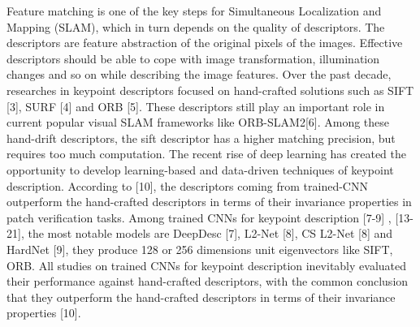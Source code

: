 \documentclass[letterpaper, 10 pt, conference]{ieeeconf}  %
\begin{document}
Feature matching is one of the key steps for Simultaneous Localization and Mapping (SLAM), which in turn depends on the quality of descriptors. The descriptors are feature abstraction of the original pixels of the images. Effective descriptors should be able to cope with image transformation, illumination changes and so on while describing the image features.
Over the past decade, researches in keypoint descriptors focused on hand-crafted solutions such as SIFT [3], SURF [4] and ORB [5]. These descriptors still play an important role in current popular visual SLAM frameworks like ORB-SLAM2[6]. Among these hand-drift descriptors, the sift descriptor has a higher matching precision, but requires too much computation. 
The recent rise of deep learning has created the opportunity to develop learning-based and data-driven techniques of keypoint description. According to [10], the descriptors coming from trained-CNN outperform the hand-crafted descriptors in terms of their invariance properties in patch verification tasks. Among trained CNNs for keypoint description [7-9] , [13-21], the most notable models are DeepDesc [7], L2-Net [8], CS L2-Net [8] and HardNet [9], they produce 128 or 256 dimensions unit eigenvectors like SIFT, ORB. All studies on trained CNNs for keypoint description inevitably evaluated their performance against hand-crafted descriptors, with the common conclusion that they outperform the hand-crafted descriptors in terms of their invariance properties [10].
\end{document}
